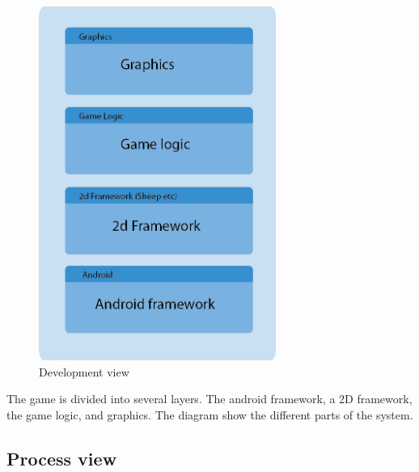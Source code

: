 \begin{figure}[H]
\begin{center}
\includegraphics[width=220pt]{./Images/DevelopmentView.png}
\end{center}
\caption{Development view}
\end{figure}

The game is divided into several layers. The android framework, a 2D framework, the game logic, and graphics. The diagram show the different parts of the system.

\pagebreak

\subsection{Process view}

